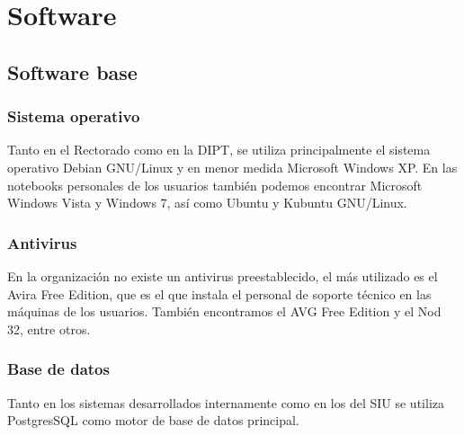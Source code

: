 \documentclass[a4paper,11pt,oneside]{article}
\begin{document}
\section{Software}
%
\subsection{Software base}
%
\subsubsection*{Sistema operativo}
Tanto en el Rectorado como en la DIPT, se utiliza principalmente el
sistema operativo Debian GNU/Linux y en menor medida Microsoft Windows
XP. En las notebooks personales de los usuarios también podemos
encontrar Microsoft Windows Vista y Windows 7, así como Ubuntu y
Kubuntu GNU/Linux.
%
\subsubsection*{Antivirus}
En la organización no existe un antivirus preestablecido, el más
utilizado es el Avira Free Edition, que es el que instala el personal de
soporte técnico en las máquinas de los usuarios. También encontramos
el AVG Free Edition y el Nod 32, entre otros.
%
\subsubsection*{Base de datos}
%
Tanto en los sistemas desarrollados internamente como en los del SIU
se utiliza PostgresSQL como motor de base de datos principal.
%
\end{document}
